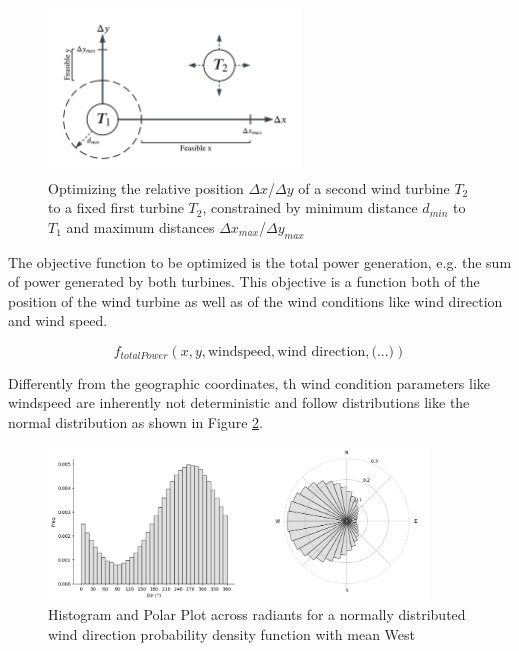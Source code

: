 \begin{figure}[h] 
	\centering
	\includegraphics[width=0.6\textwidth]{figures/optimization/two_turbine_problem_schematic.png} %
	\caption{Optimizing the relative position $\Delta x$/$\Delta y$ of a second wind turbine $T_2$ to a fixed first turbine $T_2$, constrained by minimum distance $d_{min}$ to  $T_1$ and maximum distances $\Delta x_{max}$/$\Delta y_{max}$}
	\label{fig:two_turbine_problem}
\end{figure}

The objective function to be optimized is the total power generation, e.g. the sum of power generated by both turbines. This objective is a function both of the position of the wind turbine as well as of the wind conditions like wind direction and wind speed. 

$$
f_{total Power}(x,y,\text{windspeed},\text{wind direction}, \text{(...)})
$$

Differently from the geographic coordinates, th wind condition parameters like windspeed are inherently not deterministic and follow distributions like the normal distribution as shown in Figure \ref{fig:wind_dist}.

\begin{figure}[h] 
	\centering
	\includegraphics[width=0.9\textwidth]{figures/optimization/wind_dist.png} %
	\caption{Histogram and Polar Plot across radiants for a normally distributed wind direction probability density function with mean West}
	\label{fig:wind_dist}
\end{figure}

